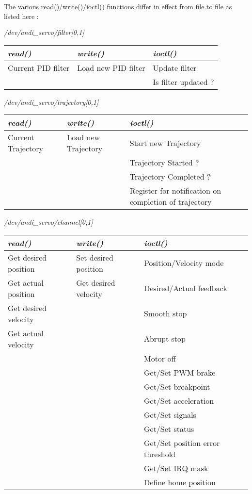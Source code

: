 \documentclass[a4paper,11pt]{article}
\begin{document}
The various read()/write()/ioctl() functions differ in effect from file
to file as listed here :



\medskip
\textit{/dev/andi\_servo/filter[0,1]}
\\
\tiny
\sffamily
\begin{tabular}{||l|l|l||}
\hline
\textit{read()} & \textit{write()} & \textit{ioctl()} \\
\hline
Current PID filter & Load new PID filter & Update filter \\
 & & Is filter updated ? \\
\hline
\end{tabular}
\normalsize
\normalfont


\medskip
\textit{/dev/andi\_servo/trajectory[0,1]}
\\
\tiny
\sffamily
\begin{tabular}{||l|l|l||}
\hline
\textit{read()} & \textit{write()} & \textit{ioctl()} \\
\hline
Current Trajectory & Load new Trajectory & Start new Trajectory \\
 & & Trajectory Started ? \\
 & & Trajectory Completed ? \\
 & & Register for notification on completion of trajectory \\
\hline
\end{tabular}
\normalsize
\normalfont


\medskip
\textit{/dev/andi\_servo/channel[0,1]}
\\
\tiny
\sffamily
\begin{tabular}{||l|l|l||}
\hline
\textit{read()} & \textit{write()} & \textit{ioctl()} \\
\hline
Get desired position & Set desired position & Position/Velocity mode \\
 Get actual position & Get desired velocity & Desired/Actual feedback \\ 
 Get desired velocity & & Smooth stop \\
 Get actual velocity & & Abrupt stop \\
 & & Motor off \\
 & & Get/Set PWM brake \\
 & & Get/Set breakpoint \\
 & & Get/Set acceleration \\
 & & Get/Set signals \\
 & & Get/Set status \\
 & & Get/Set position error threshold \\
 & & Get/Set IRQ mask \\
 & & Define home position \\
\hline
\end{tabular}
\normalsize
\normalfont
\end{document}
